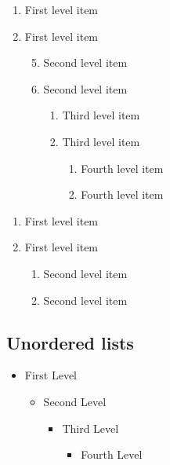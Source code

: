 \documentclass{article}
\begin{document}
\begin{enumerate}
    \item First level item
    \item First level item
        \begin{enumerate}
            \setcounter{enumii}{4}
            \item Second level item
            \item Second level item
                \begin{enumerate}
                    \item Third level item
                    \item Third level item
                        \begin{enumerate}
                            \item Fourth level item
                            \item Fourth level item
                        \end{enumerate}
                \end{enumerate}
        \end{enumerate}
\end{enumerate}


\begin{enumerate}[label=(\arabic*)]
    \item First level item
    \item First level item
        \begin{enumerate}[label=\alph*)]
            \item Second level item
            \item Second level item
        \end{enumerate}
\end{enumerate}

 
\subsection{Unordered lists}
 
\begin{itemize}
    \item  First Level
        \begin{itemize}
            \item  Second Level
                \begin{itemize}
                    \item  Third Level
                        \begin{itemize}
                            \item  Fourth Level
                        \end{itemize}
                \end{itemize}
        \end{itemize}
\end{itemize}
\end{document}
